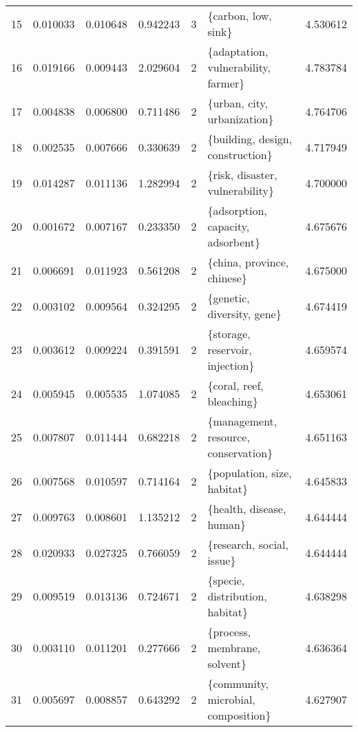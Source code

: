 \begin{tabular}{lrrrrlr}
15 &    0.010033 &  0.010648 &        0.942243 &           3 &                     \{carbon, low, sink\} &  4.530612 \\
16 &    0.019166 &  0.009443 &        2.029604 &           2 &     \{adaptation, vulnerability, farmer\} &  4.783784 \\
17 &    0.004838 &  0.006800 &        0.711486 &           2 &             \{urban, city, urbanization\} &  4.764706 \\
18 &    0.002535 &  0.007666 &        0.330639 &           2 &        \{building, design, construction\} &  4.717949 \\
19 &    0.014287 &  0.011136 &        1.282994 &           2 &         \{risk, disaster, vulnerability\} &  4.700000 \\
20 &    0.001672 &  0.007167 &        0.233350 &           2 &       \{adsorption, capacity, adsorbent\} &  4.675676 \\
21 &    0.006691 &  0.011923 &        0.561208 &           2 &              \{china, province, chinese\} &  4.675000 \\
22 &    0.003102 &  0.009564 &        0.324295 &           2 &              \{genetic, diversity, gene\} &  4.674419 \\
23 &    0.003612 &  0.009224 &        0.391591 &           2 &         \{storage, reservoir, injection\} &  4.659574 \\
24 &    0.005945 &  0.005535 &        1.074085 &           2 &                \{coral, reef, bleaching\} &  4.653061 \\
25 &    0.007807 &  0.011444 &        0.682218 &           2 &    \{management, resource, conservation\} &  4.651163 \\
26 &    0.007568 &  0.010597 &        0.714164 &           2 &             \{population, size, habitat\} &  4.645833 \\
27 &    0.009763 &  0.008601 &        1.135212 &           2 &                \{health, disease, human\} &  4.644444 \\
28 &    0.020933 &  0.027325 &        0.766059 &           2 &               \{research, social, issue\} &  4.644444 \\
29 &    0.009519 &  0.013136 &        0.724671 &           2 &         \{specie, distribution, habitat\} &  4.638298 \\
30 &    0.003110 &  0.011201 &        0.277666 &           2 &            \{process, membrane, solvent\} &  4.636364 \\
31 &    0.005697 &  0.008857 &        0.643292 &           2 &     \{community, microbial, composition\} &  4.627907 \\

\end{tabular}
